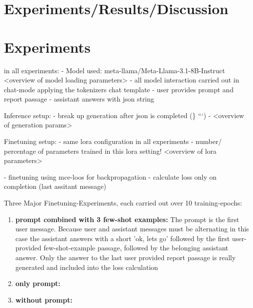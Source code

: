\documentclass{article}
\begin{document}
\section{Experiments/Results/Discussion}


\section{Experiments}

in all experiments:
- Model used: meta-llama/Meta-Llama-3.1-8B-Instruct
<overview of model loading parameters>
- all model interaction carried out in chat-mode applying the tokenizers chat template
    - user provides prompt and report passage
    - assistant answers with json string


Inference setup:
- break up generation after json is completed (\} ```)
- <overview of generation params>

 
Finetuning setup:
- same lora configuration in all experiments 
- number/ percentage of parameters trained in this lora setting!
<overview of lora parameters>

- finetuning using mce-loos for backpropagation
- calculate loss only on completion (last assitant message)


Three Major Finetuning-Experiments, each carried out over 10 training-epochs:
\begin{enumerate}
    \item \textbf{prompt combined with 3 few-shot examples:} The prompt is the first user message. Because user and assistant messages must be alternating in this case the assistant answers with a short 'ok, lets go' followed by the first user-provided few-shot-example passage, followed by the belonging assistant answer. Only the answer to the last user provided report passage is really generated and included into the loss calculation
    \item \textbf{only prompt:} 
    \item \textbf{without prompt:}
\end{enumerate}
\end{document}
